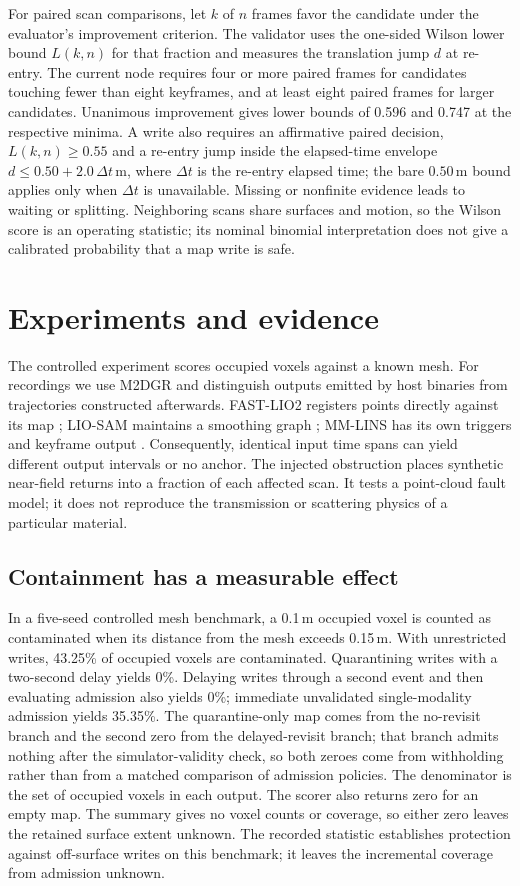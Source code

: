 \documentclass[conference]{IEEEtran}
\begin{document}
For paired scan comparisons, let $k$ of $n$ frames favor the candidate under the evaluator's improvement criterion. The validator uses the one-sided Wilson lower bound $L(k,n)$ for that fraction and measures the translation jump $d$ at re-entry. The current node requires four or more paired frames for candidates touching fewer than eight keyframes, and at least eight paired frames for larger candidates. Unanimous improvement gives lower bounds of 0.596 and 0.747 at the respective minima. A write also requires an affirmative paired decision, $L(k,n)\geq0.55$ and a re-entry jump inside the elapsed-time envelope $d\leq0.50+2.0\,\Delta t$\,m, where $\Delta t$ is the re-entry elapsed time; the bare $0.50$\,m bound applies only when $\Delta t$ is unavailable. Missing or nonfinite evidence leads to waiting or splitting. Neighboring scans share surfaces and motion, so the Wilson score is an operating statistic; its nominal binomial interpretation does not give a calibrated probability that a map write is safe.

\section{Experiments and evidence}
The controlled experiment scores occupied voxels against a known mesh. For recordings we use M2DGR \cite{yin2022m2dgr} and distinguish outputs emitted by host binaries from trajectories constructed afterwards. FAST-LIO2 registers points directly against its map \cite{xu2022fastlio2}; LIO-SAM maintains a smoothing graph \cite{shan2020liosam}; MM-LINS has its own triggers and keyframe output \cite{ma2025mmlins}. Consequently, identical input time spans can yield different output intervals or no anchor. The injected obstruction places synthetic near-field returns into a fraction of each affected scan. It tests a point-cloud fault model; it does not reproduce the transmission or scattering physics of a particular material.

\subsection{Containment has a measurable effect}
In a five-seed controlled mesh benchmark, a 0.1\,m occupied voxel is counted as contaminated when its distance from the mesh exceeds 0.15\,m. With unrestricted writes, 43.25\% of occupied voxels are contaminated. Quarantining writes with a two-second delay yields 0\%. Delaying writes through a second event and then evaluating admission also yields 0\%; immediate unvalidated single-modality admission yields 35.35\%. The quarantine-only map comes from the no-revisit branch and the second zero from the delayed-revisit branch; that branch admits nothing after the simulator-validity check, so both zeroes come from withholding rather than from a matched comparison of admission policies. The denominator is the set of occupied voxels in each output. The scorer also returns zero for an empty map. The summary gives no voxel counts or coverage, so either zero leaves the retained surface extent unknown. The recorded statistic establishes protection against off-surface writes on this benchmark; it leaves the incremental coverage from admission unknown.
\end{document}
